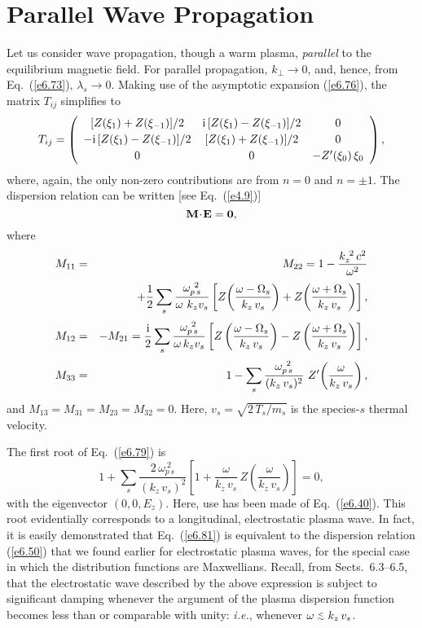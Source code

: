 \section{Parallel Wave Propagation}
Let us consider wave propagation, though a warm
plasma,  {\em parallel}\/ to the equilibrium magnetic field. For parallel propagation,
$k_\perp\rightarrow 0$, and, hence, from Eq.~(\ref{e6.73}), $\lambda_s\rightarrow 0$. 
Making use of the asymptotic expansion (\ref{e6.76}), the matrix $T_{ij}$ 
simplifies to 
\begin{equation}
T_{ij} = \left( \begin{array}{ccc}
[Z(\xi_1)+Z(\xi_{-1})]/2 & {\rm i}\,[Z(\xi_1)
-Z(\xi_{-1})]/2 &
 0
\\[0.5ex]
 -{\rm i}\,[Z(\xi_1)-Z(\xi_{-1})]/2 & 
[Z(\xi_1)+Z(\xi_{-1})]/2 &  0 \\[0.5ex]
0 & 0
&-Z'(\xi_0)\,\xi_0
\end{array}
\right),
\end{equation}
where, again, the only non-zero contributions are from $n=0$ and $n=\pm 1$. 
The dispersion relation can be written [see Eq.~(\ref{e4.9})]
\begin{equation}\label{e6.79}
{\bf M}\!\cdot\! {\bf E} = {\bf 0},
\end{equation}
where
\begin{eqnarray}
M_{11}&=& M_{22} = 1-\frac{k_z^{~2}\,c^2}{\omega^2} \nonumber\\[0.5ex]
&&+\frac{1}{2}\sum_s 
\frac{\omega_{p\,s}^{~2}}
{\omega\,\,k_z v_s} \left[Z\!\left(\frac{\omega - {\Omega}_s}{k_z\,v_s}\right)
+ Z\!\left(\frac{\omega + {\Omega}_s}{k_z\,v_s}\right)\right],\\[0.5ex]
M_{12} &=&-M_{21} = \frac{\rm i}{2}\sum_s\frac{\omega_{p\,s}^{~2}}
{\omega\,k_z v_s} \left[Z\left(\frac{\omega - {\Omega}_s}{k_z\,v_s}\right)
- Z\left(\frac{\omega + {\Omega}_s}{k_z\,v_s}\right)\right],\\[0.5ex]
M_{33} &=& 1 - \sum_s \frac{\omega_{p\,s}^{~2}}
{(k_z\,v_s)^2} \,\,Z'\!\left(\frac{\omega}{k_z\,v_s}\right),
\end{eqnarray}
and $M_{13} = M_{31} = M_{23}=M_{32}=0$. Here, $v_s= \sqrt{2\,T_s/m_s}$ is
the species-$s$ thermal velocity.

The first root of Eq.~(\ref{e6.79}) is
\begin{equation}\label{e6.81}
1 +\sum_s\frac{2\,\omega_{p\,s}^{~2}}
{(k_z\,v_s)^2} \left[1+
\frac{\omega}{k_z\,v_s}\,Z\!\left(\frac{\omega}{k_z\,v_s}\right)\right] =0,
\end{equation}
with the eigenvector $(0,0,E_z)$. 
Here, use has been made of Eq.~(\ref{e6.40}).
This root evidentially corresponds to
a longitudinal, electrostatic plasma wave. In fact, it is easily
demonstrated that Eq.~(\ref{e6.81}) is equivalent to the dispersion relation
(\ref{e6.50}) that we found earlier for electrostatic
plasma waves, for the special case in which the distribution
functions are Maxwellians. Recall, from Sects.~6.3--6.5, that the
electrostatic wave described by the above expression is subject to
significant damping whenever the argument of the plasma dispersion
function becomes less than or comparable with unity: {\em i.e.}, whenever
$\omega\stackrel {_{\normalsize<}}{_{\normalsize \sim}} k_z\,v_s$. 

